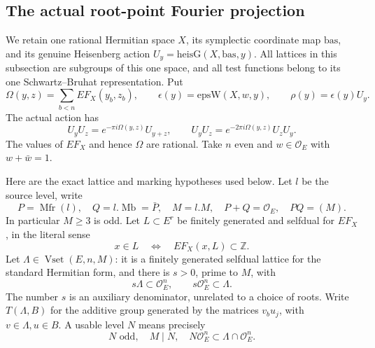 \subsection{The actual root-point Fourier projection}
\label{subsec:ftb-root-fourier-projection}

We retain one rational Hermitian space \(X\), its symplectic
coordinate map \(\mathrm{bas}\), and its genuine Heisenberg action
\(U_y=\mathrm{heisG}(X,\mathrm{bas},y)\). All lattices in this
subsection are subgroups of this one space, and all test functions
belong to its one Schwartz--Bruhat representation.
Put
\[
 \Omega(y,z)=\sum_{b<n}EF_X(y_b,z_b),\qquad
 \epsilon(y)=\mathrm{epsW}(X,w,y),\qquad
 \rho(y)=\epsilon(y)U_y .
\]
The actual action has
\[
 U_yU_z=e^{-\pi i\Omega(y,z)}U_{y+z},\qquad
 U_yU_z=e^{-2\pi i\Omega(y,z)}U_zU_y.             \tag{RP1}
\]
The values of \(EF_X\) and hence \(\Omega\) are rational.
Take \(n\) even and \(w\in\mathcal O_E\) with \(w+\bar w=1\).

Here are the exact lattice and marking hypotheses used below.
Let \(l\) be the source level, write
\[
 P=\operatorname{Mfr}(l),\quad Q=l.\operatorname{Mb}=\bar P,
 \quad M=l.M,\quad P+Q=\mathcal O_E,\quad PQ=(M).
\]
In particular \(M\geq3\) is odd. Let \(L\subset E^r\) be finitely
generated and selfdual for \(EF_X\), in the literal sense
\[
 x\in L\quad\Longleftrightarrow\quad
                         EF_X(x,L)\subset\mathbb Z.       \tag{RP2}
\]
Let \(\Lambda\in\operatorname{Vset}(E,n,M)\): it is a finitely
generated selfdual lattice for the standard Hermitian form, and
there is \(s>0\), prime to \(M\), with
\[
 s\Lambda\subset\mathcal O_E^n,\qquad
                         s\mathcal O_E^n\subset\Lambda.   \tag{RP3}
\]
The number \(s\) is an auxiliary denominator, unrelated to a
choice of roots. Write \(T(\Lambda,B)\) for the additive group
generated by the matrices \(v_bu_j\), with \(v\in\Lambda,u\in B\).
A usable level \(N\) means precisely
\[
 N\text{ odd},\quad M\mid N,\quad
                N\mathcal O_E^n\subset\Lambda\cap\mathcal O_E^n.
                                                               \tag{RP4}
\]


